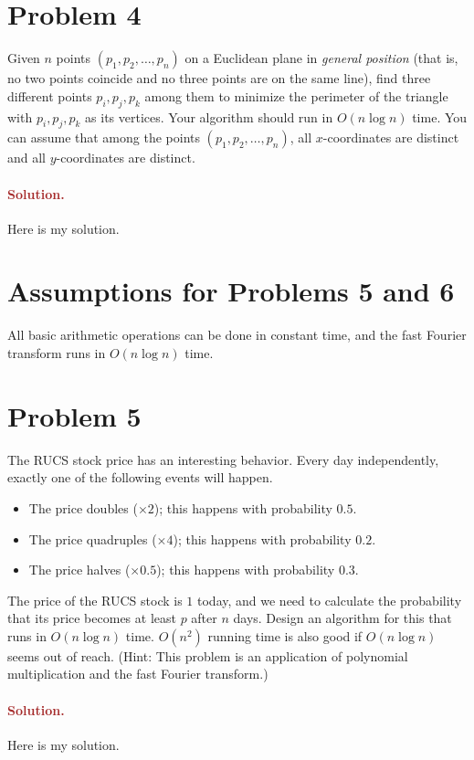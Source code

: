 \section*{Problem 4}
Given $n$ points $(p_1, p_2, \ldots, p_n)$ on a Euclidean plane in \emph{general position} (that is, no two points coincide and no three points are on the same line), find three different points $p_i, p_j, p_k$ among them to minimize the perimeter of the triangle with $p_i, p_j, p_k$ as its vertices. Your algorithm should run in $O(n \log n)$ time. You can assume that among the points $(p_1, p_2, \ldots, p_n)$, all $x$-coordinates are distinct and all $y$-coordinates are distinct.

\paragraph{\textcolor{brown}{Solution.}}
Here is my solution.

\section*{Assumptions for Problems 5 and 6}
All basic arithmetic operations can be done in constant time, and the fast Fourier transform runs in $O(n \log n)$ time.

\section*{Problem 5}
The RUCS stock price has an interesting behavior. Every day independently, exactly one of the following events will happen.
\begin{itemize}
    \item The price doubles ($\times 2$); this happens with probability $0.5$.
    \item The price quadruples ($\times 4$); this happens with probability $0.2$.
    \item The price halves ($\times 0.5$); this happens with probability $0.3$.
\end{itemize}

The price of the RUCS stock is $1$ today, and we need to calculate the probability that its price becomes at least $p$ after $n$ days. Design an algorithm for this that runs in $O(n \log n)$ time. $O(n^2)$ running time is also good if $O(n \log n)$ seems out of reach. (Hint: This problem is an application of polynomial multiplication and the fast Fourier transform.)

\paragraph{\textcolor{brown}{Solution.}}
Here is my solution.

